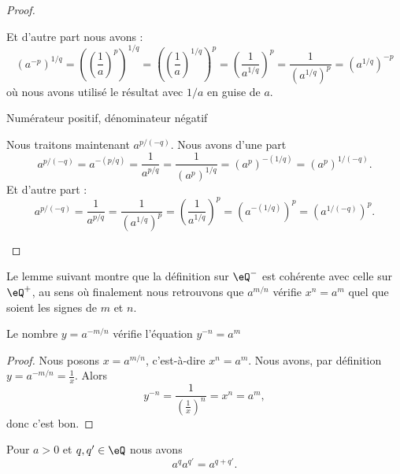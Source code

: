 \begin{proof}
\begin{subproof}
            Et d'autre part nous avons :
            \begin{equation}
                (a^{-p})^{1/q}=\left( \left( \frac{1}{ a } \right)^p \right)^{1/q}=\left( \left( \frac{1}{ a } \right)^{1/q} \right)^p=\left( \frac{1}{ a^{1/q} } \right)^p=\frac{1}{ (a^{1/q})^p }=(a^{1/q})^{-p}
            \end{equation}
            où nous avons utilisé le résultat avec \( 1/a\) en guise de \( a\).

        \item[Numérateur positif, dénominateur négatif]

            Nous traitons maintenant \( a^{p/(-q)}\). Nous avons d'une part
            \begin{equation}
                a^{p/(-q)}=a^{-(p/q)}=\frac{1}{ a^{p/q} }=\frac{1}{ (a^p)^{1/q} }=(a^p)^{-(1/q)}=(a^p)^{1/(-q)}.
            \end{equation}
            Et d'autre part :
            \begin{equation}
                a^{p/(-q)}=\frac{1}{ a^{p/q} }=\frac{1}{ (a^{1/q})^p }=\left( \frac{1}{ a^{1/q} } \right)^p=\left( a^{-(1/q)} \right)^p=(a^{1/(-q)})^p.
            \end{equation}
    \end{subproof}
\end{proof}

Le lemme suivant montre que la définition sur \( \eQ^-\) est cohérente avec celle sur \( \eQ^+\), au sens où finalement nous retrouvons que \( a^{m/n}\) vérifie \( x^n=a^m \) quel que soient les signes de \( m\) et \( n\).
\begin{lemma}
    Le nombre \( y=a^{-m/n}\) vérifie l'équation \( y^{-n}=a^m\)
\end{lemma}

\begin{proof}
    Nous posons \( x=a^{m/n}\), c'est-à-dire \( x^n=a^m\). Nous avons, par définition \( y=a^{-m/n}=\frac{1}{ x }\). Alors
    \begin{equation}
        y^{-n}=\frac{1}{ \left( \frac{1}{ x } \right)^n }=x^n=a^m,
    \end{equation}
    donc c'est bon.
\end{proof}

\begin{lemma}        \label{LEMooJYGUooHhLASp}
    Pour \( a>0\) et \( q,q'\in \eQ\) nous avons
    \begin{equation}
        a^qa^{q'}=a^{q+q'}.
    \end{equation}
\end{lemma}

